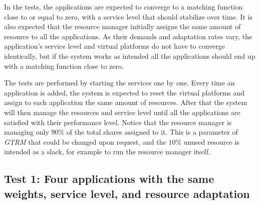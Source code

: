 \documentclass[nobiblatex]{LTHthesis}
\begin{document}
In the tests, the applications are expected to converge to a matching function close to or
equal to zero, with a service level that should stabilize over time. It is 
also expected that the resource manager initially assigns the same amount
of resource to all the applications. As their demands and adaptation
rates vary, the application's service level and virtual platforms do not 
have to converge identically, but if the system works as intended all the
applications should end up with a matching function close to zero.

The tests are performed by starting the services one by one. Every time 
an application is added, the system is expected to reset the virtual
platforms and assign to each application the same amount of resources. 
After that the system will then manage the resources and service level 
until all the applications are satisfied with their performance level.
Notice that the resource manager is managing only $90\%$ of the total 
shares assigned to it. This is a parameter of \emph{GTRM} that could be changed
upon request, and the $10\%$ unused resource is intended as a slack, for
example to run the resource manager itself.

\subsection{Test 1: Four applications with the same weights, 
  service level, and resource adaptation}
\end{document}
